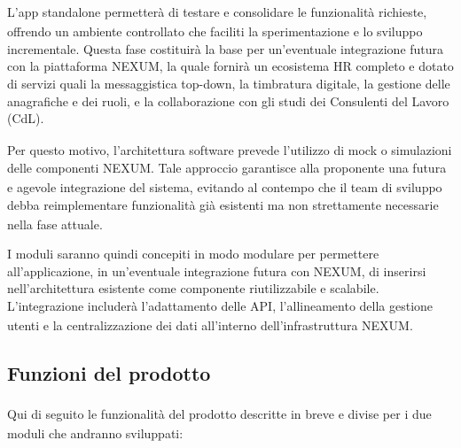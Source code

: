 ﻿\documentclass[a4paper,11pt]{article}
\begin{document}
L'app standalone permetterà di testare e consolidare le funzionalità\textsubscript{} richieste, offrendo un ambiente controllato che faciliti la sperimentazione e lo sviluppo incrementale. Questa fase costituirà la base per un'eventuale integrazione futura con la piattaforma NEXUM, la quale fornirà un ecosistema HR completo e dotato di servizi quali la messaggistica top-down, la timbratura digitale, la gestione delle anagrafiche e dei ruoli, e la collaborazione con gli studi dei Consulenti del Lavoro (CdL)\textsubscript{}.

Per questo motivo, l'architettura software prevede l'utilizzo di mock o simulazioni delle componenti NEXUM. Tale approccio garantisce alla proponente\textsubscript{} una futura e agevole integrazione del sistema, evitando al contempo che il team di sviluppo debba reimplementare funzionalità\textsubscript{} già esistenti ma non strettamente necessarie nella fase attuale.

I moduli saranno quindi concepiti in modo modulare per permettere all'applicazione, in un'eventuale integrazione futura con NEXUM, di inserirsi nell'architettura esistente come componente riutilizzabile e scalabile. L'integrazione includerà l'adattamento delle API\textsubscript{}, l'allineamento della gestione utenti e la centralizzazione dei dati all'interno dell'infrastruttura NEXUM.

\subsection{Funzioni del prodotto\textsubscript{}}

Qui di seguito le funzionalità\textsubscript{} del prodotto\textsubscript{} descritte in breve e divise per i due moduli che andranno sviluppati:
\end{document}
